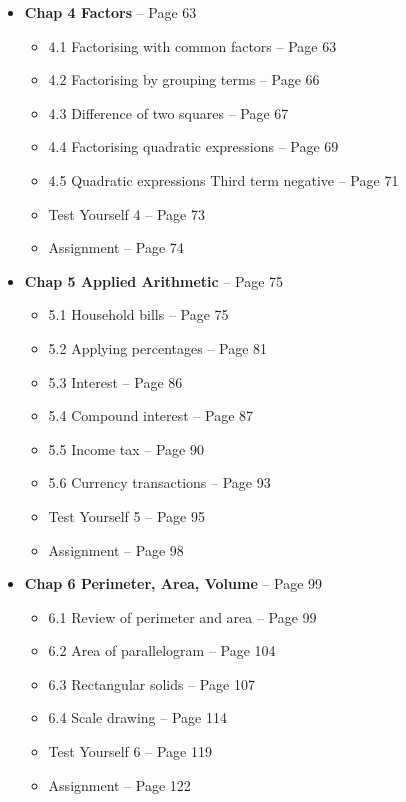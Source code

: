 \documentclass{article}
\begin{document}
\begin{itemize}
    \item \textbf{Chap 4 Factors} -- Page 63
    \begin{itemize}
        \item 4.1 Factorising with common factors -- Page 63
        \item 4.2 Factorising by grouping terms -- Page 66
        \item 4.3 Difference of two squares -- Page 67
        \item 4.4 Factorising quadratic expressions -- Page 69
        \item 4.5 Quadratic expressions Third term negative -- Page 71
        \item Test Yourself 4 -- Page 73
        \item Assignment -- Page 74
    \end{itemize}

    \item \textbf{Chap 5 Applied Arithmetic} -- Page 75
    \begin{itemize}
        \item 5.1 Household bills -- Page 75
        \item 5.2 Applying percentages -- Page 81
        \item 5.3 Interest -- Page 86
        \item 5.4 Compound interest -- Page 87
        \item 5.5 Income tax -- Page 90
        \item 5.6 Currency transactions -- Page 93
        \item Test Yourself 5 -- Page 95
        \item Assignment -- Page 98
    \end{itemize}

    \item \textbf{Chap 6 Perimeter, Area, Volume} -- Page 99
    \begin{itemize}
        \item 6.1 Review of perimeter and area -- Page 99
        \item 6.2 Area of parallelogram -- Page 104
        \item 6.3 Rectangular solids -- Page 107
        \item 6.4 Scale drawing -- Page 114
        \item Test Yourself 6 -- Page 119
        \item Assignment -- Page 122
    \end{itemize}


\end{itemize}
\end{document}
